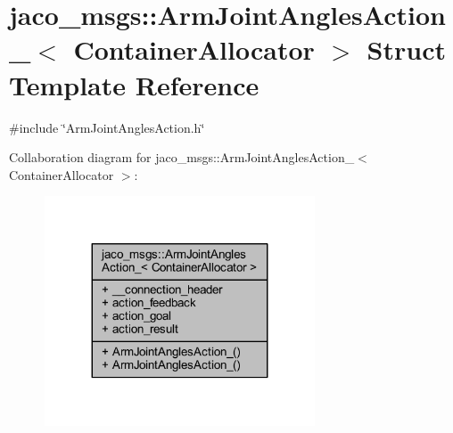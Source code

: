 \hypertarget{structjaco__msgs_1_1ArmJointAnglesAction__}{}\section{jaco\+\_\+msgs\+:\+:Arm\+Joint\+Angles\+Action\+\_\+$<$ Container\+Allocator $>$ Struct Template Reference}
\label{structjaco__msgs_1_1ArmJointAnglesAction__}


{\ttfamily \#include \char`\"{}Arm\+Joint\+Angles\+Action.\+h\char`\"{}}



Collaboration diagram for jaco\+\_\+msgs\+:\+:Arm\+Joint\+Angles\+Action\+\_\+$<$ Container\+Allocator $>$\+:
\nopagebreak
\begin{figure}[H]
\begin{center}
\leavevmode
\includegraphics[width=227pt]{d1/d83/structjaco__msgs_1_1ArmJointAnglesAction____coll__graph}
\end{center}
\end{figure}
